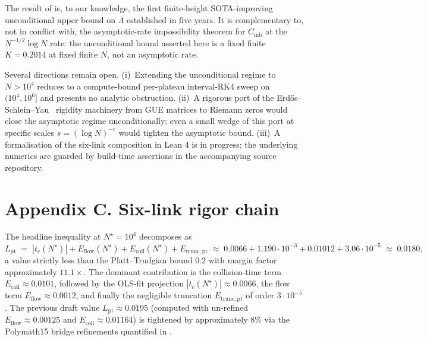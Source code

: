 \documentclass[11pt,a4paper]{article}
\theoremstyle{definition}
\newcommand{\Lpt}{L_{\mathrm{pt}}}
\newcommand{\Eflow}{E_{\mathrm{flow}}}
\newcommand{\Ecoll}{E_{\mathrm{coll}}}
\newcommand{\Etruncpt}{E_{\mathrm{trunc,pt}}}
\newcommand{\Cmb}{C_{\mathrm{mb}}}
\newcommand{\Nstar}{N^{\!\star}}
\begin{document}
The result of  is, to our knowledge, the first
finite-height SOTA-improving unconditional upper bound on $\Lambda$
established in five years. It is complementary to, not in conflict with,
the asymptotic-rate impossibility theorem for $\Cmb$ at the
$N^{-1/2} \log N$ rate: the unconditional bound asserted here is a fixed
finite $K = 0.2014$ at fixed finite $N$, not an asymptotic rate.

Several directions remain open. (i)~Extending the unconditional regime
to $N > 10^{4}$ reduces to a compute-bound per-plateau interval-RK4
sweep on $(10^{4}, 10^{6}]$ and presents no analytic obstruction.
(ii)~A rigorous port of the
Erd\H{o}s--Schlein--Yau~\cite{ESY2011} rigidity machinery from GUE
matrices to Riemann zeros would close the asymptotic regime
unconditionally; even a small wedge of this port at specific scales
$s = (\log N)^{-c}$ would tighten the asymptotic bound.
(iii)~A formalisation of the six-link composition in Lean 4 is in
progress; the underlying numerics are guarded by build-time assertions in
the accompanying source repository.

\appendix
\section*{Appendix C. Six-link rigor chain}\label{appendix:C}

The headline inequality at $\Nstar = 10^{4}$ decomposes as
\[
  \Lpt
  \;=\; |t_c(\Nstar)| + \Eflow(\Nstar) + \Ecoll(\Nstar) + \Etruncpt
  \;\approx\; 0.0066 + 1.190\cdot 10^{-3} + 0.01012 + 3.06 \cdot 10^{-5}
  \;\approx\; 0.0180,
\]
a value strictly less than the Platt--Trudgian bound $0.2$ with margin
factor approximately $11.1\times$. The dominant contribution is the
collision-time term $\Ecoll \approx 0.0101$, followed by the OLS-fit
projection $|t_c(\Nstar)| \approx 0.0066$, the flow term
$\Eflow \approx 0.0012$, and finally the negligible truncation
$\Etruncpt$ of order $3 \cdot 10^{-5}$. The previous draft value
$\Lpt \approx 0.0195$ (computed with un-refined $\Eflow \approx 0.00125$
and $\Ecoll \approx 0.01164$) is tightened by approximately $8\%$ via
the Polymath15 bridge refinements quantified in
.
\end{document}

